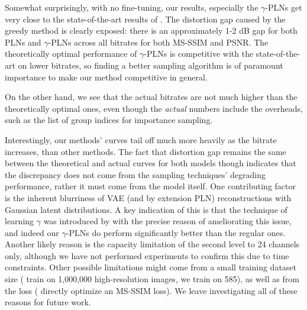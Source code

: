 \par
Somewhat surprisingly, with no fine-tuning, our results, especially the
$\gamma$-PLNs get very close to the state-of-the-art results of
\cite{balle2018variational}. The distortion gap caused by the greedy method is
clearly exposed: there is an approximately 1-2 dB gap for both PLNs and
$\gamma$-PLNs across all bitrates for both MS-SSIM and PSNR.
The theoretically optimal performance of $\gamma$-PLNs is competitive with the
state-of-the-art on lower bitrates, so finding a better sampling algorithm
is of paramount importance to make our method competitive in general.
\par
On the other hand, we see that the actual bitrates are not much higher than the
theoretically optimal ones, even
though the \textit{actual} numbers include the overheads, such as the list of
group indices for importance sampling.

\par
Interestingly, our methods' curves tail off much more heavily as the bitrate increases,
than other methods. The fact that distortion gap remains the same between the
theoretical and actual curves for both models though indicates that the discrepancy
does not come from the sampling techniques' degrading performance, rather it
must come from the model itself. One contributing factor is the inherent
blurriness of VAE (and by extension PLN) reconstructions with Gaussian latent
distributions. A key indication of this is that the technique of learning
$\gamma$ was introduced by \cite{dai2019diagnosing} with the precise reason of
ameliorating this issue, and indeed our $\gamma$-PLNs do perform significantly
better than the regular ones. Another likely reason is the capacity limitation
of the second level to 24 channels only, although we have not performed
experiments to confirm this due to time constraints. Other possible limitations
might come from a small training dataset size (\cite{balle2018variational} train
on 1,000,000 high-resolution images, we train on 585), as well as from the loss
(\cite{balle2018variational} directly optimize an MS-SSIM loss). We leave
investigating all of these reasons for future work.


